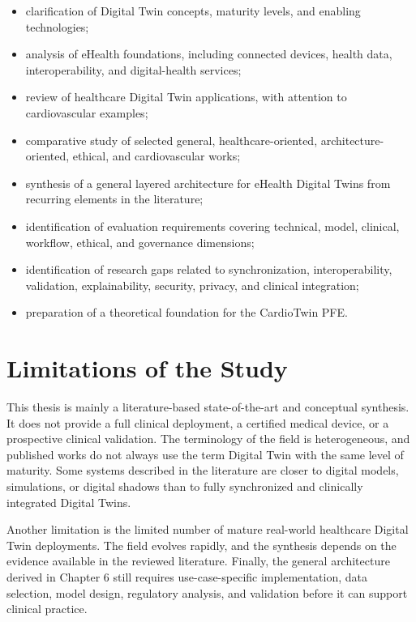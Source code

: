 \begin{itemize}[leftmargin=*]
    \item clarification of Digital Twin concepts, maturity levels, and enabling technologies;
    \item analysis of eHealth foundations, including connected devices, health data, interoperability, and digital-health services;
    \item review of healthcare Digital Twin applications, with attention to cardiovascular examples;
    \item comparative study of selected general, healthcare-oriented, architecture-oriented, ethical, and cardiovascular works;
    \item synthesis of a general layered architecture for eHealth Digital Twins from recurring elements in the literature;
    \item identification of evaluation requirements covering technical, model, clinical, workflow, ethical, and governance dimensions;
    \item identification of research gaps related to synchronization, interoperability, validation, explainability, security, privacy, and clinical integration;
    \item preparation of a theoretical foundation for the CardioTwin PFE.
\end{itemize}

\section{Limitations of the Study}
This thesis is mainly a literature-based state-of-the-art and conceptual synthesis. It does not provide a full clinical deployment, a certified medical device, or a prospective clinical validation. The terminology of the field is heterogeneous, and published works do not always use the term Digital Twin with the same level of maturity. Some systems described in the literature are closer to digital models, simulations, or digital shadows than to fully synchronized and clinically integrated Digital Twins.

Another limitation is the limited number of mature real-world healthcare Digital Twin deployments. The field evolves rapidly, and the synthesis depends on the evidence available in the reviewed literature. Finally, the general architecture derived in Chapter 6 still requires use-case-specific implementation, data selection, model design, regulatory analysis, and validation before it can support clinical practice.

